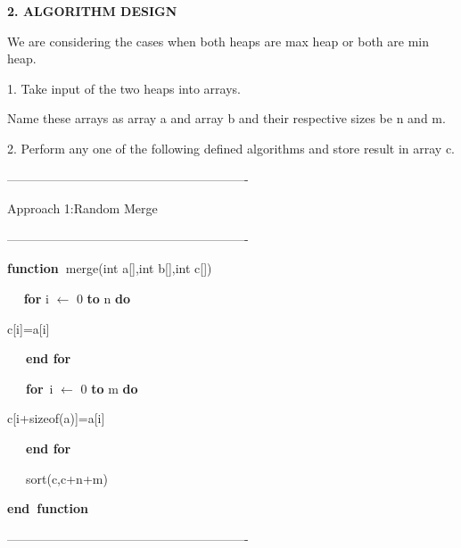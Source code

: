 \begin{multicols}{2}
\begin{enumerate}
\vspace{\baselineskip}
\begin{Center}
\textbf{2. ALGORITHM DESIGN}
\end{Center}\par

We are considering the cases when both heaps are max heap or both are min heap.\par

1. Take input of the two heaps into arrays.\par

Name these arrays as array a and array b and their respective sizes be n and m.\par

2. Perform any one of the following defined algorithms and store result in array c.\par


\vspace{\baselineskip}
----------------------------------------------------------\par

Approach 1:Random Merge\par

----------------------------------------------------------\par

\textbf{function\  }merge(int a[],int b[],int c[])\par

\ \  \textbf{ for } i $ \leftarrow $  0 \textbf{to} n \textbf{do}\par

\tab c[i]=a[i]\par

\ \ \  \textbf{end for}\par

\ \ \  \textbf{for}\  i $ \leftarrow $  0 \textbf{to} m \textbf{do}\par

\tab c[i+sizeof(a)]=a[i]\par

\ \ \  \textbf{end for}\par

\ \ \  sort(c,c+n+m) \par

\textbf{end\  function}\par

----------------------------------------------------------\par


\end{enumerate}
\end{multicols}
